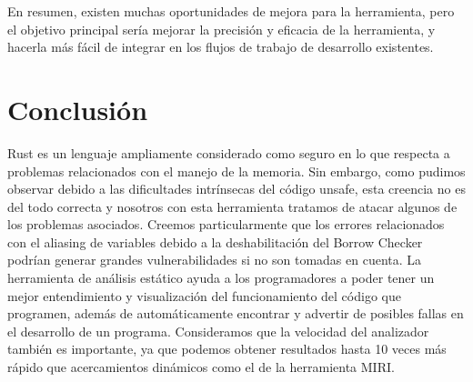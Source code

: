 En resumen, existen muchas oportunidades de mejora para la herramienta, pero el objetivo principal sería mejorar la precisión y eficacia de la herramienta, y hacerla más fácil de integrar en los flujos de trabajo de desarrollo existentes.

\section{Conclusión}

Rust es un lenguaje ampliamente considerado como seguro en lo que respecta a problemas relacionados con el manejo de la memoria. Sin embargo, como pudimos observar debido a las dificultades intrínsecas del código unsafe, esta creencia no es del todo correcta y nosotros con esta herramienta tratamos de atacar algunos de los problemas asociados. Creemos particularmente que los errores relacionados con el aliasing de variables debido a la deshabilitación del Borrow Checker podrían generar grandes vulnerabilidades si no son tomadas en cuenta. La herramienta de análisis estático ayuda a los programadores a poder tener un mejor entendimiento y visualización del funcionamiento del código que programen, además de automáticamente encontrar y advertir de posibles fallas en el desarrollo de un programa. Consideramos que la velocidad del analizador también es importante, ya que podemos obtener resultados hasta 10 veces más rápido que acercamientos dinámicos como el de la herramienta MIRI. 



